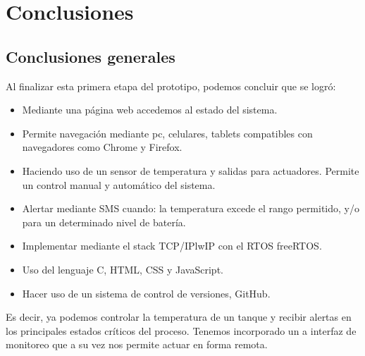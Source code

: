 
\chapter{Conclusiones} %

\label{Chapter5} %




\section{Conclusiones generales }


Al finalizar esta primera etapa del prototipo, podemos concluir que se logró:
  \begin{itemize}
    \item Mediante una página web accedemos al estado del sistema.
    \item Permite navegación mediante pc, celulares, tablets compatibles con navegadores como Chrome y Firefox.
    \item Haciendo uso de un sensor de temperatura y salidas para actuadores. Permite un control manual y automático del sistema.
    \item Alertar mediante SMS cuando: la temperatura excede el rango permitido, y/o para un determinado nivel de batería.
    \item Implementar mediante el stack TCP/IPlwIP con el RTOS freeRTOS. 
    \item Uso del lenguaje C, HTML, CSS y JavaScript. 
    \item Hacer uso de un sistema de control de versiones, GitHub. 
   \end{itemize} 

Es decir, ya podemos controlar la temperatura de un tanque y recibir alertas en los principales estados críticos del proceso. Tenemos incorporado un a interfaz de monitoreo que a su vez nos permite actuar en forma remota.  



